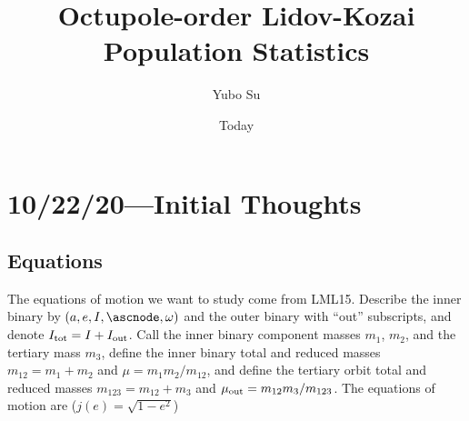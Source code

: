 \documentclass[10pt]{article}%
\newcommand*{\p}[1]{\left(#1\right)}
\begin{document}
\linespread{1.15}

\title{Octupole-order Lidov-Kozai Population Statistics}
\author{Yubo Su}
\date{Today}

\maketitle

\section{10/22/20---Initial Thoughts}

\subsection{Equations}

The equations of motion we want to study come from LML15. Describe the inner
binary by $\p{a, e, I, \ascnode, \omega}$ and the outer binary with ``out''
subscripts, and denote $I_{\rm tot} = I + I_{\rm out}$. Call the inner binary
component masses $m_1$, $m_2$, and the tertiary mass $m_3$, define the inner
binary total and reduced masses $m_{12} = m_1 + m_2$ and $\mu = m_1m_2 /
m_{12}$, and define the tertiary orbit total and reduced masses $m_{123} =
m_{12} + m_3$ and $\mu_{\rm out} = m_{12}m_3 / m_{123}$. The equations of motion
are ($j(e) = \sqrt{1 - e^2}$)
\end{document}
